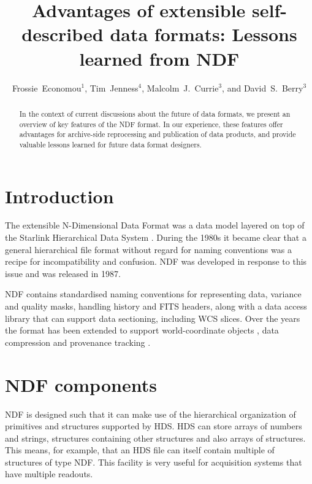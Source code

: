 \documentclass[11pt,twoside]{article}
\begin{document}
\title{Advantages of extensible self-described data formats: Lessons learned from NDF}
\author{Frossie~Economou$^1$, Tim~Jenness$^4$, Malcolm~J.~Currie$^3$,
and David~S.~Berry$^3$
}

\begin{abstract}
  In the context of current discussions about the future of data
  formats, we present an overview of key features of the NDF
  format. In our experience, these features offer advantages for
  archive-side reprocessing and publication of data products, and
  provide valuable lessons learned for future data format designers.
\end{abstract}

\section{Introduction}

The extensible N-Dimensional Data Format
\citep[NDF;][]{1988STARB...2...11C,1993ASPC...52..229W,SGP38} was a
data model layered on top of the Starlink Hierarchical Data System
\citep[HDS;][]{1982QJRAS..23..485D}. During the 1980s it became clear
that a general hierarchical file format without regard for naming
conventions was a recipe for incompatibility and confusion. NDF was
developed in response to this issue and was released in 1987.

NDF contains standardised naming conventions for representing data,
variance and quality masks, handling history and FITS headers, along
with a data access library that can support data sectioning, including
WCS slices. Over the years the format has been extended to support
world-coordinate objects \citep{2001ASPC..238..129B}, data compression
\citep{2008ASPC..394..650C} and provenance tracking
\citep{2009ASPC..411..418J}.

\section{NDF components}

NDF is designed such that it can make use of the hierarchical
organization of primitives and structures supported by HDS. HDS can
store arrays of numbers and strings, structures containing other
structures and also arrays of structures. This means, for example,
that an HDS file can itself contain multiple of structures of type
NDF. This facility is very useful for acquisition systems that have
multiple readouts.
\end{document}
